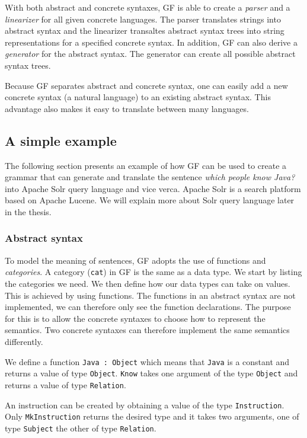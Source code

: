 With both abstract and concrete syntaxes, GF is able to create a \emph{parser} and a \emph{linearizer} for all given concrete languages. The parser translates strings into abstract syntax and the linearizer transaltes abstract syntax trees into string representations for a specified concrete syntax. In addition, GF can also derive a \emph{generator} for the abstract syntax. The generator can create all possible abstract syntax trees.

Because GF separates abstract and concrete syntax, one can easily add a new concrete syntax (a natural language) to an existing abstract syntax. This advantage also makes it easy to translate between many languages.

\subsection{A simple example}\label{sec:simple-example}
The following section presents an example of how GF can be used to create a grammar that can generate and translate the sentence \emph{which people know Java?} into Apache Solr query language and vice verca. Apache Solr is a search platform based on Apache Lucene. We will explain more about Solr query language later in the thesis.

\subsubsection*{Abstract syntax}
To model the meaning of sentences, GF adopts the use of functions and \emph{categories}. A category (\texttt{cat}) in GF is the same as a data type. We start by listing the categories we need. We then define how our data types can take on values. This is achieved by using functions. The functions in an abstract syntax are not implemented, we can therefore only see the function declarations. The purpose for this is to allow the concrete syntaxes to choose how to represent the semantics. Two concrete syntaxes can therefore implement the same semantics differently.

We define a function \texttt{Java : Object} which means that \texttt{Java} is a constant  and returns a value of type \texttt{Object}. \texttt{Know} takes one argument of the type \texttt{Object} and returns a value of type \texttt{Relation}.

An instruction can be created by obtaining a value of the type \texttt{Instruction}. Only \texttt{MkInstruction} returns the desired type and it takes two arguments, one of type \texttt{Subject} the other of type \texttt{Relation}.

